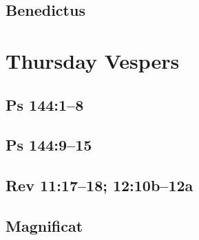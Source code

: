 {%
\parindent 0pt
\noindent
\ifx\preLilyPondExample \undefined
\else
  \expandafter\preLilyPondExample
\fi
\def\lilypondbook{}%

\ifx\postLilyPondExample \undefined
\else
  \expandafter\postLilyPondExample
\fi
}

\subsection{Benedictus}

{%
\parindent 0pt
\noindent
\ifx\preLilyPondExample \undefined
\else
  \expandafter\preLilyPondExample
\fi
\def\lilypondbook{}%

\ifx\postLilyPondExample \undefined
\else
  \expandafter\postLilyPondExample
\fi
}


\section{Thursday Vespers}

\subsection{Ps 144:1--8}

{%
\parindent 0pt
\noindent
\ifx\preLilyPondExample \undefined
\else
  \expandafter\preLilyPondExample
\fi
\def\lilypondbook{}%

\ifx\postLilyPondExample \undefined
\else
  \expandafter\postLilyPondExample
\fi
}

\subsection{Ps 144:9--15}

{%
\parindent 0pt
\noindent
\ifx\preLilyPondExample \undefined
\else
  \expandafter\preLilyPondExample
\fi
\def\lilypondbook{}%

\ifx\postLilyPondExample \undefined
\else
  \expandafter\postLilyPondExample
\fi
}

\subsection{Rev 11:17--18; 12:10b--12a}

{%
\parindent 0pt
\noindent
\ifx\preLilyPondExample \undefined
\else
  \expandafter\preLilyPondExample
\fi
\def\lilypondbook{}%

\ifx\postLilyPondExample \undefined
\else
  \expandafter\postLilyPondExample
\fi
}

\subsection{Magnificat}

